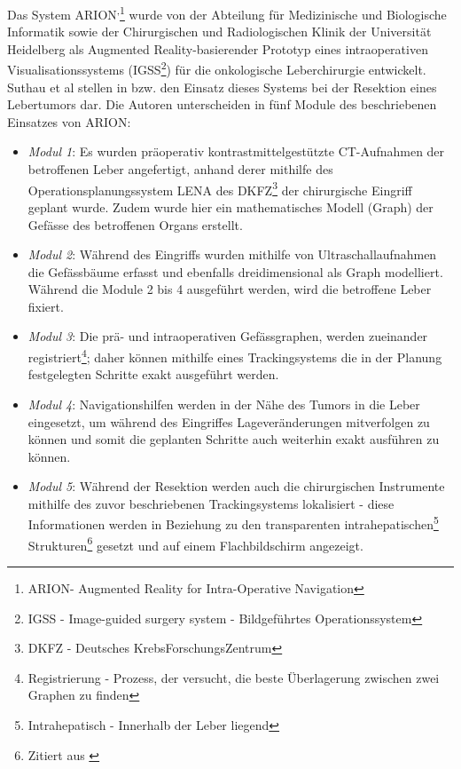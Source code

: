 \documentclass[pdftex,a4paper,titlepage,12pt]{scrartcl}
\newtheorem[L]{boxedDefinition}{Definition}
\begin{document}
Das System ARION\texttrademark\textsuperscript{,}\footnote{ARION\texttrademark - Augmented Reality for Intra-Operative Navigation} wurde von der Abteilung für Medizinische und Biologische Informatik sowie der Chirurgischen und Radiologischen Klinik der Universität Heidelberg als Augmented Reality-basierender Prototyp eines intraoperativen Visualisationssystems (IGSS\footnote{IGSS - Image-guided surgery system - Bildgeführtes Operationssystem}) für die onkologische Leberchirurgie entwickelt. Suthau et al stellen in \cite{Suthau2002DE} bzw. \cite{Suthau2002} den Einsatz dieses Systems bei der Resektion eines Lebertumors dar. Die Autoren unterscheiden in \cite{Suthau2002DE} fünf Module des beschriebenen Einsatzes von ARION\texttrademark:
\begin{itemize}
 \item \textit{Modul 1}: Es wurden präoperativ kontrastmittelgestützte CT-Aufnahmen der betroffenen Leber angefertigt, anhand derer mithilfe des Operationsplanungssystem LENA des DKFZ\footnote{DKFZ - Deutsches KrebsForschungsZentrum} der chirurgische Eingriff geplant wurde. Zudem wurde hier ein mathematisches Modell (Graph) der Gefässe des betroffenen Organs erstellt.
 \item \textit{Modul 2}: Während des Eingriffs wurden mithilfe von Ultraschallaufnahmen die Gefässbäume erfasst und ebenfalls dreidimensional als Graph modelliert. Während die Module 2 bis 4 ausgeführt werden, wird die betroffene Leber fixiert.
 \item \textit{Modul 3}: Die prä- und intraoperativen Gefässgraphen, werden zueinander registriert\footnote{Registrierung - Prozess, der versucht, die beste Überlagerung zwischen zwei Graphen zu finden}; daher können mithilfe eines Trackingsystems die in der Planung festgelegten Schritte exakt ausgeführt werden.
 \item \textit{Modul 4}: Navigationshilfen werden in der Nähe des Tumors in die Leber eingesetzt, um während des Eingriffes Lageveränderungen mitverfolgen zu können und somit die geplanten Schritte auch weiterhin exakt ausführen zu können.
 \item \textit{Modul 5}: Während der Resektion werden auch die chirurgischen Instrumente mithilfe des zuvor beschriebenen Trackingsystems lokalisiert - diese Informationen werden \glqq in Beziehung zu den transparenten intrahepatischen\footnote{Intrahepatisch - Innerhalb der Leber liegend} Strukturen\grqq\footnote{Zitiert aus \cite[Kapitel 2, Seite 3]{Suthau2002DE}} gesetzt und auf einem Flachbildschirm angezeigt.
\end{itemize}
\end{document}
